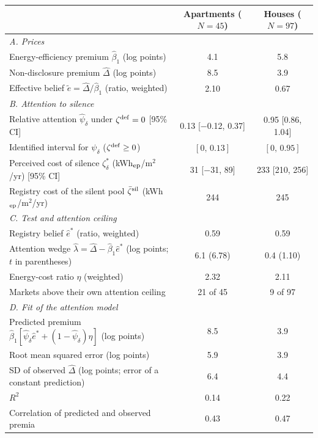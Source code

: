 \begin{tabular*}{\textwidth}{@{\extracolsep{\fill}}lcc@{}}
\toprule\toprule
 & \textbf{Apartments} ($N=45$) & \textbf{Houses} ($N=97$) \\
\midrule
\multicolumn{3}{l}{\textit{A. Prices}} \\
Energy-efficiency premium $\hat\beta_1$ (log points) & 4.1 & 5.8 \\
Non-disclosure premium $\hat\Delta$ (log points) & 8.5 & 3.9 \\
Effective belief $\tilde e=\hat\Delta/\hat\beta_1$ (ratio, weighted) & 2.10 & 0.67 \\
\midrule
\multicolumn{3}{l}{\textit{B. Attention to silence}} \\
Relative attention $\hat\psi_\delta$ under $\zeta^{\rm def}=0$ [95\% CI] & 0.13 [\ensuremath{-}0.12, 0.37] & 0.95 [0.86, 1.04] \\
Identified interval for $\psi_\delta$ ($\zeta^{\rm def}\ge0$) & $[0,\,0.13]$ & $[0,\,0.95]$ \\
Perceived cost of silence $\zeta^*_\delta$ (kWh$_{\rm ep}$/m$^2$/yr) [95\% CI] & 31 [\ensuremath{-}31, 89] & 233 [210, 256] \\
Registry cost of the silent pool $\bar\zeta^{\rm sil}$ (kWh$_{\rm ep}$/m$^2$/yr) & 244 & 245 \\
\midrule
\multicolumn{3}{l}{\textit{C. Test and attention ceiling}} \\
Registry belief $\hat e^*$ (ratio, weighted) & 0.59 & 0.59 \\
Attention wedge $\hat\lambda=\hat\Delta-\hat\beta_1\hat e^*$ (log points; $t$ in parentheses) & 6.1 (6.78) & 0.4 (1.10) \\
Energy-cost ratio $\eta$ (weighted) & 2.32 & 2.11 \\
Markets above their own attention ceiling & 21 of 45 & 9 of 97 \\
\midrule
\multicolumn{3}{l}{\textit{D. Fit of the attention model}} \\
Predicted premium $\hat\beta_1[\hat\psi_\delta\hat e^*+(1-\hat\psi_\delta)\eta]$ (log points) & 8.5 & 3.9 \\
Root mean squared error (log points) & 5.9 & 3.9 \\
SD of observed $\hat\Delta$ (log points; error of a constant prediction) & 6.4 & 4.4 \\
$R^2$ & 0.14 & 0.22 \\
Correlation of predicted and observed premia & 0.43 & 0.47 \\
\bottomrule\bottomrule
\end{tabular*}
